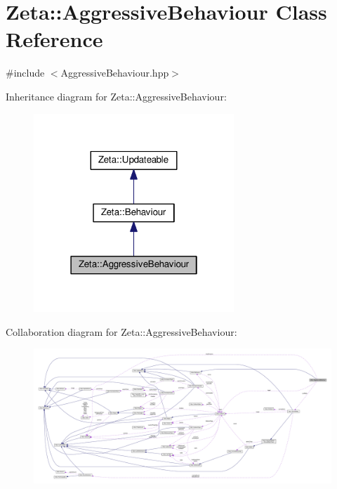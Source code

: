 \hypertarget{classZeta_1_1AggressiveBehaviour}{\section{Zeta\+:\+:Aggressive\+Behaviour Class Reference}
\label{classZeta_1_1AggressiveBehaviour}
}


{\ttfamily \#include $<$Aggressive\+Behaviour.\+hpp$>$}



Inheritance diagram for Zeta\+:\+:Aggressive\+Behaviour\+:\nopagebreak
\begin{figure}[H]
\begin{center}
\leavevmode
\includegraphics[width=214pt]{classZeta_1_1AggressiveBehaviour__inherit__graph}
\end{center}
\end{figure}


Collaboration diagram for Zeta\+:\+:Aggressive\+Behaviour\+:
\nopagebreak
\begin{figure}[H]
\begin{center}
\leavevmode
\includegraphics[width=350pt]{classZeta_1_1AggressiveBehaviour__coll__graph}
\end{center}
\end{figure}
